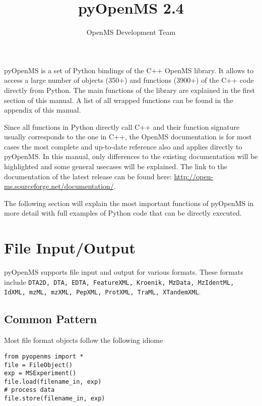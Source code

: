 \documentclass[10pt]{article}
\title{pyOpenMS 2.4}
\author{OpenMS Development Team}
\date{}
\begin{document}
  \maketitle

  pyOpenMS is a set of Python bindings of the C++ OpenMS library. It allows to
  access a large number of objects (350+) and functions (3900+) of the C++
  code directly from Python.
  The main functions of the library are explained in the first section of this
  manual. A list of all wrapped functions can be found in the appendix of this
  manual.

  Since all functions in Python directly call C++ and their function signature
  usually corresponds to the one in C++, the OpenMS documentation is for most
  cases the most complete and up-to-date reference also and applies directly
  to pyOpenMS. In this manual, only differences to the existing documentation
  will be highlighted and some general usecases will be explained. The link to
  the documentation of the latest release can be found here:
  \url{http://open-ms.sourceforge.net/documentation/}.

  \tableofcontents

  \pagebreak

  The following section will explain the most important functions of pyOpenMS
  in more detail with full examples of Python code that can be directly
  executed.

\section{File Input/Output}

  pyOpenMS supports file input and output for various formats. These formats
  include \texttt{DTA2D, DTA, EDTA, FeatureXML, Kroenik, MzData, MzIdentML, IdXML, mzML,
  mzXML, PepXML, ProtXML, TraML, XTandemXML}.

\subsection{Common Pattern}

Most file format objects follow the following idiome

\begin{verbatim}
from pyopenms import *
file = FileObject()
exp = MSExperiment()
file.load(filename_in, exp)
# process data
file.store(filename_in, exp)
\end{verbatim}
\end{document}
